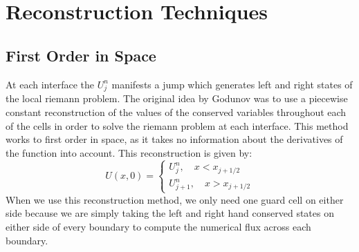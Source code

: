 \section{Reconstruction Techniques}
\subsection{First Order in Space}
At each interface the $U_j^n$ manifests a jump which generates left and right states of the local riemann problem. The original idea by Godunov was to use a piecewise constant reconstruction of the values of the conserved variables throughout each of the cells in order to solve the riemann problem at each interface. This method works to first order in space, as it takes no information about the derivatives of the function into account. This reconstruction is given by:
\[U(x,0)=\begin{cases}
                U_j^n , \quad x < x_{j+1/2}\\
                U_{j+1}^n ,\quad x > x_{j+1/2}
        \end{cases}\]
When we use this reconstruction method, we only need one guard cell on either side because we are simply taking the left and right hand conserved states on either side of every boundary to compute the numerical flux across each boundary. 
